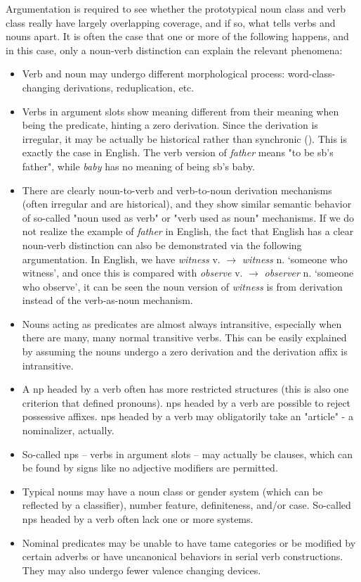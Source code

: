 \documentclass[UTF8, a4paper, oneside, scheme=plain]{ctexart}
\newcommand*{\corpus}[1]{\emph{#1}}
\newcommand*{\translate}[1]{`#1'}
\begin{document}
Argumentation is required to see whether the prototypical noun class and verb class
really have largely overlapping coverage,
and if so, 
what tells verbs and nouns apart.
It is often the case that one or more of the following
happens, and in this case,
only a noun-verb distinction can explain the relevant phenomena: 
\begin{itemize}
    \item Verb and noun may undergo different morphological process: word-class-changing derivations, reduplication, etc.
    \item Verbs in argument slots show meaning different from their meaning when being the predicate,
    hinting a zero derivation.
    Since the derivation is irregular, 
    it may be actually be historical rather than synchronic ().
    This is exactly the case in English. 
    The verb version of \corpus{father} means "to be sb's father", 
    while \corpus{baby} has no meaning of being sb's baby.
    \item There are clearly noun-to-verb and verb-to-noun derivation mechanisms
    (often irregular and are historical), 
    and they show similar semantic behavior of so-called "noun used as verb" or "verb used as noun" mechanisms.
    If we do not realize the example of \corpus{father} in English,
    the fact that English has a clear noun-verb distinction 
    can also be demonstrated via the following argumentation.
    In English, we have
    \corpus{witness} v. $\to$ \corpus{witness} n. \translate{someone who witness},
    and once this is compared with 
    \corpus{observe} v. $\to$ \corpus{observer} n. \translate{someone who observe},
    it can be seen the noun version of \corpus{witness}
    is from derivation instead of the verb-as-noun mechanism.
    \item Nouns acting as predicates are almost always intransitive, 
    especially when there are many, many normal transitive verbs. 
    This can be easily explained by 
    assuming the nouns undergo a zero derivation and the derivation affix is intransitive. 
    \item A \ac{np} headed by a verb often has more restricted structures 
    (this is also one criterion that defined pronouns).
    \ac{np}s headed by a verb are possible to reject possessive affixes.
    \ac{np}s headed by a verb may obligatorily take an "article" - a nominalizer, actually.
    \item So-called \ac{np}s -- verbs in argument slots -- 
    may actually be clauses,
    which can be found by signs like no adjective modifiers are permitted.
    \item Typical nouns may have a 
    noun class or gender system (which can be reflected by a classifier), 
    number feature, definiteness, and/or case. 
    So-called \ac{np}s headed by a verb often lack one or more systems. 
    \item Nominal predicates may 
    be unable to have \ac{tame} categories
    or be modified by certain adverbs
    or have uncanonical behaviors in serial verb constructions.
    They may also undergo fewer valence changing devices.
\end{itemize}
\end{document}
